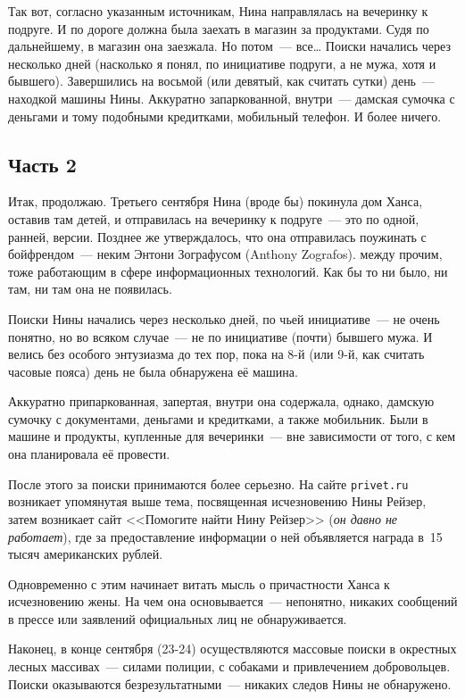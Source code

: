 Так вот, согласно указанным источникам, Нина направлялась на вечеринку к подруге. И по дороге должна была заехать в магазин за продуктами. Судя по дальнейшему, в магазин она заезжала. Но потом~--- все\dots 
Поиски начались через несколько дней (насколько я понял, по инициативе подруги, а не мужа, хотя и бывшего). Завершились на восьмой (или девятый, как считать сутки) день~--- находкой машины Нины. Аккуратно запаркованной, внутри~--- дамская сумочка с деньгами и тому подобными кредитками, мобильный телефон. И более ничего. 

\subsection{Часть 2}

Итак, продолжаю. Третьего сентября Нина (вроде бы) покинула дом Ханса, оставив там детей, и отправилась на вечеринку к подруге~--- это по одной, ранней, версии. Позднее же утверждалось, что она отправилась поужинать с бойфрендом~--- неким Энтони Зографусом (Anthony Zografos). между прочим, тоже работающим в сфере информационных технологий. Как бы то ни было, ни там, ни там она не появилась. 

Поиски Нины начались через несколько дней, по чьей инициативе~--- не очень понятно, но во всяком случае~--- не по инициативе (почти) бывшего мужа. И велись без особого энтузиазма до тех пор, пока на 8-й (или 9-й, как считать часовые пояса) день не была обнаружена её машина. 

Аккуратно припаркованная, запертая, внутри она содержала, однако, дамскую сумочку с документами, деньгами и кредитками, а также мобильник. Были в машине и продукты, купленные для вечеринки~--- вне зависимости от того, с кем она планировала её провести. 

После этого за поиски принимаются более серьезно. На сайте \texttt{privet.ru} возникает упомянутая выше тема, посвященная исчезновению Нины Рейзер, затем возникает сайт <<Помогите найти Нину Рейзер>> (\textit{он давно не работает}), где за предоставление информации о ней объявляется награда в~15 тысяч американских рублей. 

Одновременно с этим начинает витать мысль о причастности Ханса к исчезновению жены. На чем она основывается~--- непонятно, никаких сообщений в прессе или заявлений официальных лиц не обнаруживается. 

Наконец, в конце сентября (23-24) осуществляются массовые поиски в окрестных лесных массивах~--- силами полиции, с собаками и привлечением добровольцев. Поиски оказываются безрезультатными~--- никаких следов Нины не обнаружено. 

